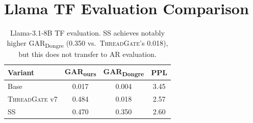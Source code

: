 \documentclass[11pt]{article}
\newcommand{\garours}{\textsc{GAR}\textsubscript{ours}}
\newcommand{\gardongre}{\textsc{GAR}\textsubscript{Dongre}}
\newcommand{\tg}{\textsc{ThreadGate}}
\renewcommand{\ss}{\textsc{SS}}
\begin{document}
\section{Llama TF Evaluation Comparison}
\label{app:llama_tf}

\begin{table}[h]
\centering
\small
\caption{Llama-3.1-8B TF evaluation. SS achieves notably higher \gardongre{} (0.350 vs.\ \tg{}'s 0.018), but this does not transfer to AR evaluation.}
\label{tab:llama_tf}
\begin{tabular}{lccc}
\toprule
\textbf{Variant} & \textbf{\garours{}} & \textbf{\gardongre{}} & \textbf{PPL} \\
\midrule
Base & 0.017 & 0.004 & 3.45 \\
\tg{} v7 & 0.484 & 0.018 & 2.57 \\
\ss{} & 0.470 & 0.350 & 2.60 \\
\bottomrule
\end{tabular}
\end{table}
\end{document}
